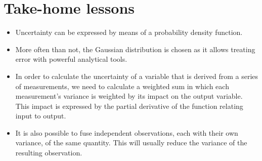 \section{Take-home lessons}
\begin{itemize}
\item Uncertainty can be expressed by means of a probability density function.
\item More often than not, the Gaussian distribution is chosen as it allows treating error with powerful analytical tools.
\item In order to calculate the uncertainty of a variable that is derived from a series of measurements, we need to calculate a weighted sum in which each measurement's variance is weighted by its impact on the output variable. This impact is expressed by the partial derivative of the function relating input to output.
\item It is also possible to fuse independent observations, each with their own variance, of the same quantity. This will usually reduce the variance of the resulting observation. 
\end{itemize}

